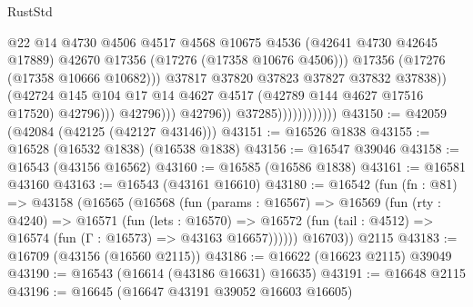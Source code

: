 \begin{lexlean}{RustStd}
\begin{coremodule}
                                                  @22
                                                  @14
                                                  @4730
                                                  @4506
                                                  @4517
                                                  @4568
                                                  @10675
                                                  @4536
                                                  (@42641 @4730 @42645 @17889)
                                                  @42670
                                                  @17356
                                                  (@17276 (@17358 @10676 @4506)))
                                                @17356
                                                (@17276 (@17358 @10666 @10682)))
                                              @37817
                                              @37820
                                              @37823
                                              @37827
                                              @37832
                                              @37838))
                                          (@42724
                                            @145
                                            @104
                                            @17
                                            @14
                                            @4627
                                            @4517
                                            (@42789 @144 @4627 @17516 @17520)
                                            @42796)))
                                      @42796)))
                                @42796))
                            @37285))))))))))))
@43150 := @42059 (@42084 (@42125 (@42127 @43146)))
@43151 := @16526 @1838
@43155 := @16528 (@16532 @1838) (@16538 @1838)
@43156 := @16547 @39046
@43158 := @16543 (@43156 @16562)
@43160 := @16585 (@16586 @1838)
@43161 := @16581 @43160
@43163 := @16543 (@43161 @16610)
@43180 := @16542
    (fun (fn : @81) =>
    @43158
      (@16565
        (@16568
          (fun (params : @16567) =>
          @16569
            (fun (rty : @4240) =>
            @16571
              (fun (lets : @16570) =>
              @16572 (fun (tail : @4512) => @16574 (fun (Γ : @16573) => @43163 @16657))))))
        @16703))
    @2115
@43183 := @16709 (@43156 (@16560 @2115))
@43186 := @16622 (@16623 @2115) @39049
@43190 := @16543 (@16614 (@43186 @16631) @16635)
@43191 := @16648 @2115
@43196 := @16645 (@16647 @43191 @39052 @16603 @16605)

\end{coremodule}
\end{lexlean}
